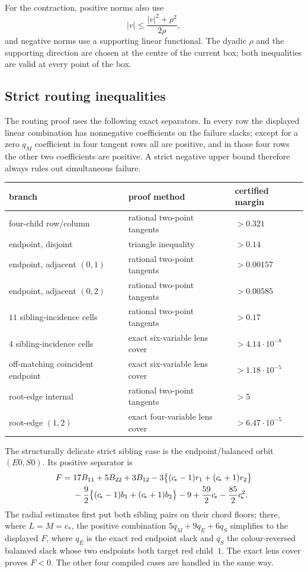 \documentclass[11pt]{article}
\theoremstyle{plain}
\theoremstyle{definition}
\theoremstyle{remark}
\newcommand{\cstar}{c_{\!*}}
\begin{document}
For the contraction, positive norms also use
\[
 |v|\le\frac{|v|^2+\rho^2}{2\rho},
\]
and negative norms use a supporting linear functional.  The dyadic $\rho$
and the supporting direction are chosen at the centre of the current box;
both inequalities are valid at every point of the box.

\subsection{Strict routing inequalities}

The routing proof uses the following exact separators.  In every row the
displayed linear combination has nonnegative coefficients on the failure
slacks; except for a zero $q_M$ coefficient in four tangent rows all are
positive, and in those four rows the other two coefficients are positive.
A strict negative upper bound therefore always rules out simultaneous
failure.

\begin{center}
\begin{tabularx}{\textwidth}{@{}YYl@{}}
\toprule
branch&proof method&certified margin\\
\midrule
four-child row/column&rational two-point tangents&$>0.321$\\
endpoint, disjoint&triangle inequality&$>0.14$\\
endpoint, adjacent $(0,1)$&rational two-point tangents&$>0.00157$\\
endpoint, adjacent $(0,2)$&rational two-point tangents&$>0.00585$\\
$11$ sibling-incidence cells&rational two-point tangents&$>0.17$\\
$4$ sibling-incidence cells&exact six-variable lens cover&$>4.14\cdot10^{-8}$\\
off-matching coincident endpoint&exact six-variable lens cover&$>1.18\cdot10^{-5}$\\
root-edge internal&rational two-point tangents&$>5$\\
root-edge $(1,2)$&exact four-variable lens cover&$>6.47\cdot10^{-5}$\\
\bottomrule
\end{tabularx}
\end{center}

The structurally delicate strict sibling case is the endpoint/balanced
orbit $(E0,S0)$.  Its positive separator is
\begin{align}\label{eq:hard-sibling}
 F={}&17B_{11}+5B_{22}+3B_{12}
 -3\bigl\{(\cstar-1)r_1+(\cstar+1)r_2\bigr\}\notag\\
 &-\frac92\bigl\{(\cstar-1)b_1+(\cstar+1)b_2\bigr\}
 -9+\frac{59}{2}\cstar-\frac{85}{2}\cstar^2 .
\end{align}
The radial estimates first put both sibling pairs on their chord floors;
there, where $L=M=\cstar$, the positive combination $5q_M+9q_E+6q_S$
simplifies to the displayed $F$, where $q_E$ is the exact red endpoint
slack and $q_S$ the colour-reversed balanced slack whose two endpoints both
target red child~$1$.  The exact lens cover proves $F<0$.  The other four
compiled cases are handled in the same way.
\end{document}
